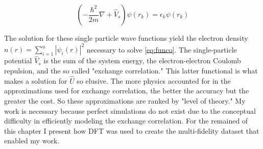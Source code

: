 \begin{equation}
\label{eq:kseq}
\left(-\frac{\hbar^2}{2m}\nabla+\hat{V}_s\right)\psi(r_k) = \epsilon_k\psi(r_k)
\end{equation}

The solution for these single particle wave functions yield the electron density \(n(r) = \sum_{i=1}^n|\psi_i(r)|^2\) necessary to solve \eqref{eq:funco}.
The single-particle potential \(\hat{V}_s\) is the sum of the system energy, the electron-electron Coulomb repulsion, and the so called "exchange correlation."
This latter functional is what makes a solution for \(\hat{U}\) so elusive.
The more physics accounted for in the approximations used for exchange correlation, the better the accuracy but the greater the cost.
So these approximations are ranked by "level of theory."
My work is necessary because perfect simulations do not exist due to the conceptual difficulty in efficiently modeling the exchange correlation.
For the remained of this chapter I present how DFT was used to create the multi-fidelity dataset that enabled my work.

